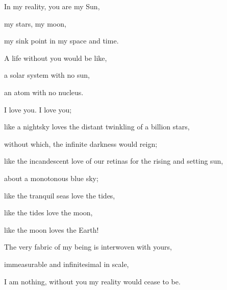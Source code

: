 \documentclass{article}
\begin{document}
In my reality, you are my Sun, 

my stars, my moon, 

my sink point in my space and time.

A life without you would be like, 

a solar system with no sun, 

an atom with no nucleus.

I love you. I love you;

like a nightsky loves the distant twinkling of a billion stars, 

without which, the infinite darkness would reign; 

like the incandescent love of our retinas for the rising and setting sun, 

about a monotonous blue sky;

like the tranquil seas love the tides, 

like the tides love the moon, 

like the moon loves the Earth!

The very fabric of my being is interwoven with yours,  

immeasurable and infinitesimal in scale,

I am nothing, without you my reality would cease to be.

   
\end{document}
